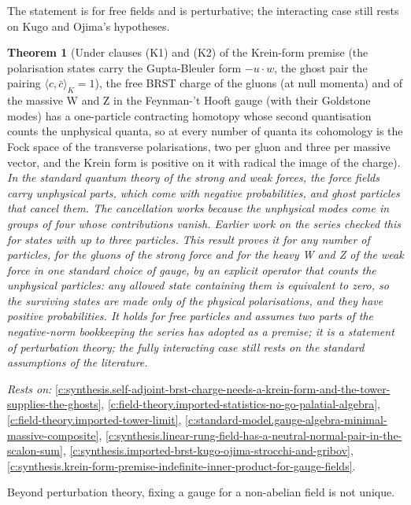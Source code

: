 \documentclass[11pt]{article}
\newtheorem{theorem}{Theorem}[section]
\theoremstyle{definition}
\theoremstyle{plain}
\begin{document}
The statement is for free fields and is perturbative; the interacting case still rests on Kugo and Ojima's hypotheses.

\begin{theorem}[Under clauses (K1) and (K2) of the Krein-form premise (the polarisation states carry the Gupta-Bleuler form $-u\cdot w$, the ghost pair the pairing $\langle c, \bar c\rangle_K = 1$), the free BRST charge of the gluons (at null momenta) and of the massive W and Z in the Feynman-'t Hooft gauge (with their Goldstone modes) has a one-particle contracting homotopy whose second quantisation counts the unphysical quanta, so at every number of quanta its cohomology is the Fock space of the transverse polarisations, two per gluon and three per massive vector, and the Krein form is positive on it with radical the image of the charge]\label{c:synthesis.quartet-homotopy-makes-gluon-and-massive-vector-physical-states-positive-at-every-number-of-quanta}
In the standard quantum theory of the strong and weak forces, the force fields carry unphysical parts, which come with negative probabilities, and ghost particles that cancel them. The cancellation works because the unphysical modes come in groups of four whose contributions vanish. Earlier work on the series checked this for states with up to three particles. This result proves it for any number of particles, for the gluons of the strong force and for the heavy W and Z of the weak force in one standard choice of gauge, by an explicit operator that counts the unphysical particles: any allowed state containing them is equivalent to zero, so the surviving states are made only of the physical polarisations, and they have positive probabilities. It holds for free particles and assumes two parts of the negative-norm bookkeeping the series has adopted as a premise; it is a statement of perturbation theory; the fully interacting case still rests on the standard assumptions of the literature.
\end{theorem}
\noindent\emph{Rests on:} \ref{c:synthesis.self-adjoint-brst-charge-needs-a-krein-form-and-the-tower-supplies-the-ghosts}, \ref{c:field-theory.imported-statistics-no-go-palatial-algebra}, \ref{c:field-theory.imported-tower-limit}, \ref{c:standard-model.gauge-algebra-minimal-massive-composite}, \ref{c:synthesis.linear-rung-field-has-a-neutral-normal-pair-in-the-scalon-sum}, \ref{c:synthesis.imported-brst-kugo-ojima-strocchi-and-gribov}, \ref{c:synthesis.krein-form-premise-indefinite-inner-product-for-gauge-fields}.

Beyond perturbation theory, fixing a gauge for a non-abelian field is not unique.
\end{document}
